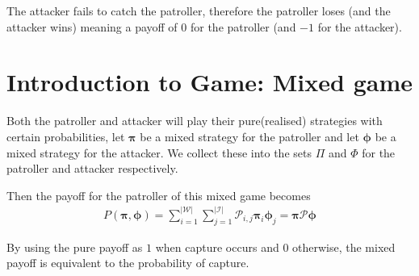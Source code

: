 \documentclass[11pt]{beamer}
\begin{document}
\begin{frame}{\insertsection}
\begin{center}

\end{center}
{
The attacker fails to catch the patroller, therefore the patroller loses (and the attacker wins) meaning a payoff of $0$ for the patroller (and $-1$ for the attacker).
}
\end{frame}

\section[]{Introduction to Game: Mixed game}
\hypertarget{Introduction to game: Mixed game}{}
\begin{frame}{\insertsection}
Both the patroller and attacker will play their pure(realised) strategies with certain probabilities, let $\bm{\pi}$ be a mixed strategy for the patroller and let $\bm{\phi}$ be a mixed strategy for the attacker. We collect these into the sets $\Pi$ and $\Phi$ for the patroller and attacker respectively.

Then the payoff for the patroller of this mixed game becomes
\begin{align*}
P(\bm{\pi} ,\bm{\phi})=\sum\limits_{i=1}^{|\mathcal{W}|} \sum\limits_{j=1}^{|\mathcal{I}|} \mathcal{P}_{i,j} \bm{\pi} _{i} \bm{\phi}_{j}
=\bm{\pi} \mathcal{P} \bm{\phi}
\end{align*}

By using the pure payoff as $1$ when capture occurs and $0$ otherwise, the mixed payoff is equivalent to the probability of capture.
\end{frame}
\end{document}
